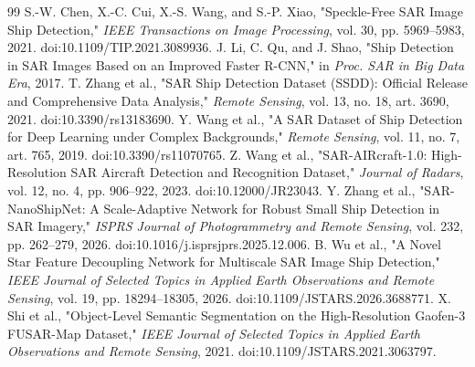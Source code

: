 \documentclass[UTF8,12pt,a4paper]{ctexart}
\begin{document}
{\begin{thebibliography}{99}
S.-W. Chen, X.-C. Cui, X.-S. Wang, and S.-P. Xiao, "Speckle-Free SAR Image Ship Detection," \emph{IEEE Transactions on Image Processing}, vol. 30, pp. 5969--5983, 2021. doi:10.1109/TIP.2021.3089936.
J. Li, C. Qu, and J. Shao, "Ship Detection in SAR Images Based on an Improved Faster R-CNN," in \emph{Proc. SAR in Big Data Era}, 2017.
T. Zhang et al., "SAR Ship Detection Dataset (SSDD): Official Release and Comprehensive Data Analysis," \emph{Remote Sensing}, vol. 13, no. 18, art. 3690, 2021. doi:10.3390/rs13183690.
Y. Wang et al., "A SAR Dataset of Ship Detection for Deep Learning under Complex Backgrounds," \emph{Remote Sensing}, vol. 11, no. 7, art. 765, 2019. doi:10.3390/rs11070765.
Z. Wang et al., "SAR-AIRcraft-1.0: High-Resolution SAR Aircraft Detection and Recognition Dataset," \emph{Journal of Radars}, vol. 12, no. 4, pp. 906--922, 2023. doi:10.12000/JR23043.
Y. Zhang et al., "SAR-NanoShipNet: A Scale-Adaptive Network for Robust Small Ship Detection in SAR Imagery," \emph{ISPRS Journal of Photogrammetry and Remote Sensing}, vol. 232, pp. 262--279, 2026. doi:10.1016/j.isprsjprs.2025.12.006.
B. Wu et al., "A Novel Star Feature Decoupling Network for Multiscale SAR Image Ship Detection," \emph{IEEE Journal of Selected Topics in Applied Earth Observations and Remote Sensing}, vol. 19, pp. 18294--18305, 2026. doi:10.1109/JSTARS.2026.3688771.
X. Shi et al., "Object-Level Semantic Segmentation on the High-Resolution Gaofen-3 FUSAR-Map Dataset," \emph{IEEE Journal of Selected Topics in Applied Earth Observations and Remote Sensing}, 2021. doi:10.1109/JSTARS.2021.3063797.
\end{thebibliography}
}
\end{document}
